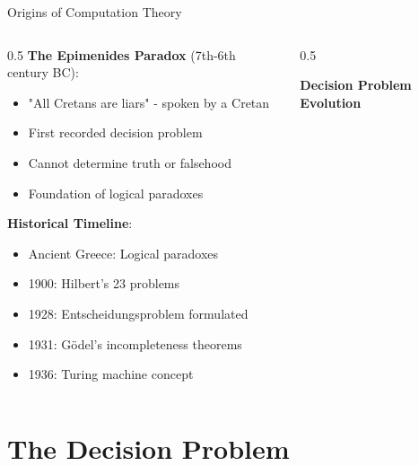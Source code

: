 \documentclass[aspectratio=169]{beamer}
\newcommand{\concept}[1]{\textbf{\color{darkblue}#1}}
\begin{document}
\begin{frame}{Origins of Computation Theory}
\begin{columns}
\begin{column}{0.5\textwidth}
\concept{The Epimenides Paradox} (7th-6th century BC):
\begin{itemize}
\item "All Cretans are liars" - spoken by a Cretan
\item First recorded decision problem
\item Cannot determine truth or falsehood
\item Foundation of logical paradoxes
\end{itemize}

\vspace{0.3cm}
\concept{Historical Timeline}:
\begin{itemize}
\item Ancient Greece: Logical paradoxes
\item 1900: Hilbert's 23 problems
\item 1928: Entscheidungsproblem formulated
\item 1931: Gödel's incompleteness theorems
\item 1936: Turing machine concept
\end{itemize}
\end{column}
\begin{column}{0.5\textwidth}
\begin{center}
\textbf{Decision Problem Evolution}
\vspace{0.3cm}

\end{center}
\end{column}
\end{columns}
\end{frame}

\section{The Decision Problem}
\end{document}
